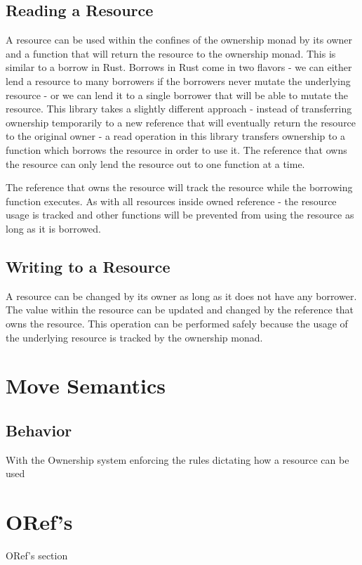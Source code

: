 \documentclass[onehalf,11pt]{beavtex}
\begin{document}
\subsection{Reading a Resource}

A resource can be used within the confines of the ownership monad by its
owner and a function that will return the resource to the ownership monad.
This is similar to a borrow in Rust.  Borrows in Rust come in two flavors - we
can either lend a resource to many borrowers if the borrowers never mutate the
underlying resource - or we can lend it to a single borrower that will be able
to mutate the resource.
This library takes a slightly different approach - instead of transferring ownership
temporarily to a new reference that will eventually return the resource to the
original owner - a read operation in this library transfers ownership to a
function which borrows the resource in order to use it.
The reference that owns the resource can only lend the resource out to one
function at a time.

The reference that owns the resource will track the resource while the borrowing
function executes. As with all resources inside owned reference - the resource
usage is tracked and other functions will be prevented from using the resource
as long as it is borrowed.

\subsection{Writing to a Resource}

A resource can be changed by its owner as long as it does not have any borrower.
The value within the resource can be updated and changed by the reference that
owns the resource. This operation can be performed safely because the usage
of the underlying resource is tracked by the ownership monad.

\section{Move Semantics}

\subsection{Behavior}

With the Ownership system enforcing the rules dictating how a resource can be
used

\section{ORef's}
ORef's section




{}

\end{document}

